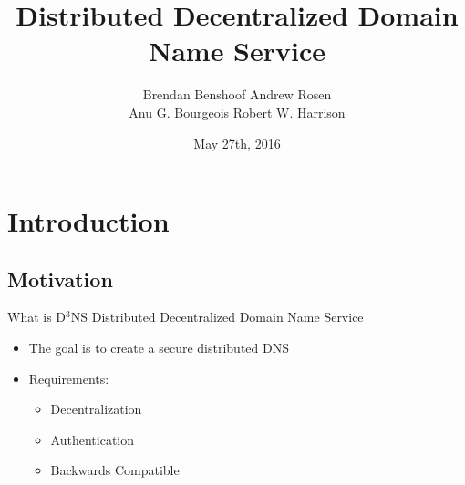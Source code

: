 \documentclass[11pt]{beamer}
\title[D$^3$NS]{Distributed Decentralized Domain Name Service}
\author{
Brendan Benshoof \qquad Andrew Rosen \\ \qquad Anu G. Bourgeois \qquad Robert W. Harrison }
\institute{Georgia State University}
\date{May 27th, 2016}
\begin{document}
	
\maketitle

\section{Introduction}
\subsection{Motivation}

\begin{frame}{What is D$^3$NS}
Distributed Decentralized Domain Name Service

\begin{itemize}
	\item The goal is to create a secure distributed DNS 
	\item Requirements:
	\begin{itemize}
		\item Decentralization
		\item Authentication
		\item Backwards Compatible
	\end{itemize}
\end{itemize}

\end{frame}


\end{document}
